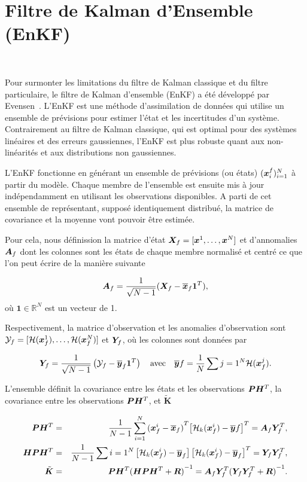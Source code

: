 \section{Filtre de Kalman d'Ensemble (EnKF)}~\label{sec:enkf}

Pour surmonter les limitations du filtre de Kalman classique et du filtre particulaire, le filtre de Kalman d'ensemble (EnKF) a été développé par Evensen~\cite{evensen_sequential_1994}. L'EnKF est une méthode d'assimilation de données qui utilise un ensemble de prévisions pour estimer l'état et les incertitudes d'un système. Contrairement au filtre de Kalman classique, qui est optimal pour des systèmes linéaires et des erreurs gaussiennes, l'EnKF est plus robuste quant aux non-linéarités et aux distributions non gaussiennes.

L'EnKF fonctionne en générant un ensemble de prévisions  (ou états) $(\bm{x}_i^f)_{i=1}^N$ à partir du modèle. Chaque membre de l'ensemble est ensuite mis à jour indépendamment en utilisant les observations disponibles. A parti de cet ensemble de représentant, supposé identiquement distribué, la matrice de covariance et la moyenne vont pouvoir être estimée.

Pour cela, nous définission la matrice d'état $\bm{X}_f = [\bm{x}^1, \dots, \bm{x}^N]$ et d'annomalies $\bm A_f$ dont les colonnes sont les états de chaque membre normalisé et centré ce que l'on peut écrire de la manière suivante

\begin{equation*}
    \bm A_f = \frac{1}{\sqrt{N - 1}}(\bm X_f - \overline{\bm{x}}_f \bm{1}^T),
\end{equation*}où $\bm{1} \in \mathbb{R}^N$ est un vecteur de 1.

Respectivement, la matrice d'observation et les anomalies d'observation sont $\mathcal Y_f = [\mathcal{H}(\bm{x}^1_f), \dots, \mathcal{H}(\bm{x}^N_f)]$ et $\bm Y_f$, où les colonnes sont données par

\begin{equation*}
    \bm Y_f = \frac{1}{\sqrt{N - 1}} \left(\mathcal Y_f - \overline{\bm{y}}_f \bm{1}^T \right) \quad \text{avec} \quad \overline{\bm{y}}f = \frac{1}{N} \sum{j=1}^{N} \mathcal{H}(\bm{x}^j_f).
\end{equation*}

L'ensemble définit la covariance entre les états et les observations $\bm{P} \bm H^T$, la covariance entre les observations $\bm{P} \bm H^T$, et $\tilde{\bm{K}}$

\begin{eqnarray*}
    \bm{P} \bm H^T &=& \frac{1}{N - 1} \sum_{i = 1}^{N} {(\bm{x}^i_f - \overline{\bm{x}}_f)}^T {\left[ \mathcal{H}_k(\bm{x}^i_f) - \overline{\bm{y}}f\right]}^T = \bm A_f \bm Y_f^T, \\
    \bm H \bm{P} \bm H^T &=& \frac{1}{N -1} \sum{i = 1}^{N}\left[ \mathcal{H}_k(\bm{x}^i_f) - \overline{\bm{y}}_f\right] {\left[ \mathcal{H}_k(\bm{x}^i_f) - \overline{\bm{y}}_f\right]}^T = \bm Y_f \bm Y_f^T,\\
    \tilde{\bm{K}} &=& \bm{P} \bm H^T{(\bm H \bm{P} \bm H^T + \bm R)}^{-1} = \bm A_f \bm Y_f^T {(\bm Y_f \bm Y_f^T + \bm R)}^{-1}.
\end{eqnarray*}

